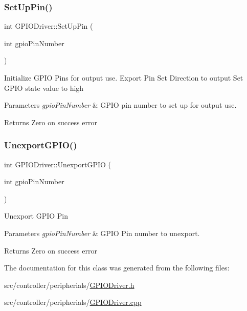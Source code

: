 \subsubsection{\texorpdfstring{Set\+Up\+Pin()}{SetUpPin()}}
{\footnotesize\ttfamily int G\+P\+I\+O\+Driver\+::\+Set\+Up\+Pin (\begin{DoxyParamCaption}\item[{int}]{gpio\+Pin\+Number }\end{DoxyParamCaption})}

Initialize G\+P\+IO Pins for output use. Export Pin Set Direction to output Set G\+P\+IO state value to high


\begin{DoxyParams}{Parameters}
{\em gpio\+Pin\+Number} & G\+P\+IO pin number to set up for output use.\\
\hline
\end{DoxyParams}
\begin{DoxyReturn}{Returns}
Zero on success error 
\end{DoxyReturn}
\mbox{\label{classGPIODriver_a28f9117bc71b9cde6c2d27f896ab7251}} 
\subsubsection{\texorpdfstring{Unexport\+G\+P\+I\+O()}{UnexportGPIO()}}
{\footnotesize\ttfamily int G\+P\+I\+O\+Driver\+::\+Unexport\+G\+P\+IO (\begin{DoxyParamCaption}\item[{int}]{gpio\+Pin\+Number }\end{DoxyParamCaption})\hspace{0.3cm}{\ttfamily [private]}}

Unexport G\+P\+IO Pin


\begin{DoxyParams}{Parameters}
{\em gpio\+Pin\+Number} & G\+P\+IO Pin number to unexport.\\
\hline
\end{DoxyParams}
\begin{DoxyReturn}{Returns}
Zero on success error 
\end{DoxyReturn}


The documentation for this class was generated from the following files\+:\begin{DoxyCompactItemize}
\item 
src/controller/peripherials/\hyperlink{GPIODriver_8h}{G\+P\+I\+O\+Driver.\+h}\item 
src/controller/peripherials/\hyperlink{GPIODriver_8cpp}{G\+P\+I\+O\+Driver.\+cpp}\end{DoxyCompactItemize}
